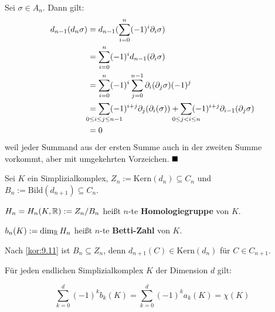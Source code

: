 \begin{beweis}
    Sei $\sigma \in A_n$. Dann gilt:
    \begin{align*}
        d_{n-1}(d_n \sigma) &= d_{n-1} (\sum_{i=0}^n (-1)^i \partial_i \sigma)\\
        &= \sum_{i=0}^n (-1)^i d_{n-1} (\partial_i \sigma)\\
        &= \sum_{i=0}^n (-1)^i \sum_{j=0}^{n-1} \partial_i (\partial_j \sigma) (-1)^j\\
        &= \sum_{\mathclap{0 \leq i \leq j \leq n-1}} (-1)^{i+j} \partial_j (\partial_i (\sigma)) + \sum_{\mathclap{0 \leq j < i \leq n}} (-1)^{i+j} \partial_{i-1} (\partial_j \sigma)\\
        &= 0
    \end{align*}
    weil jeder Summand aus der ersten Summe auch in der zweiten
    Summe vorkommt, aber mit umgekehrten Vorzeichen. $\qed$
\end{beweis}

\begin{definition}%
    Sei $K$ ein Simplizialkomplex, 
    $Z_n := \text{Kern}(d_n) \subseteq C_n$ und 
    $B_n := \text{Bild}(d_{n+1}) \subseteq C_n$.

    \begin{defenum}
        \item $H_n = H_n(K, \mathbb{R}) := Z_n / B_n$ heißt $n$-te 
              \textbf{Homologiegruppe} von $K$.
        \item $b_n(K) := \dim_{\mathbb{R}} H_n$ heißt $n$-te 
              \textbf{Betti-Zahl} von $K$.
    \end{defenum}
\end{definition}

\begin{bemerkung}
    Nach \cref{kor:9.11} ist $B_n \subseteq Z_n$, denn
    $d_{n+1}(C) \in \text{Kern}(d_n)$ für $C \in C_{n+1}$.
\end{bemerkung}

\begin{minipage}{\textwidth}%
\begin{satz}
    Für jeden endlichen Simplizialkomplex $K$ der Dimension $d$ gilt:

    \[\sum_{k=0}^d (-1)^k b_k (K) = \sum_{k=0}^d (-1)^k a_k(K) = \chi(K) \]
\end{satz}
\end{minipage}

